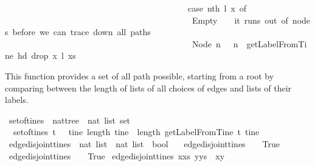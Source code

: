 \begin{isabellebody}
\ \ \ \ \ \ \ \ \ \ \ \ \ \ \ \ \ \ \ \ \ \ \ \ \ \ \ \ \ \ \ \ \ \ \ \ \ \ \ \ \ \ \ {\isacharparenleft}case\ nth\ l\ x\ of\ \isanewline
\ \ \ \ \ \ \ \ \ \ \ \ \ \ \ \ \ \ \ \ \ \ \ \ \ \ \ \ \ \ \ \ \ \ \ \ \ \ \ \ \ \ \ \ Empty\ {\isasymRightarrow}\ {\isacharbrackleft}{\isacharbrackright}\ {\isacharbar}\ {\isacharparenleft}{\isacharasterisk}it\ runs\ out\ of\ nodes\ before\ we\ can\ trace\ down\ all\ paths{\isacharasterisk}{\isacharparenright}\isanewline
\ \ \ \ \ \ \ \ \ \ \ \ \ \ \ \ \ \ \ \ \ \ \ \ \ \ \ \ \ \ \ \ \ \ \ \ \ \ \ \ \ \ \ \ Node\ n\ {\isacharunderscore}\ {\isasymRightarrow}\ n\ {\isacharhash}\ getLabelFromTine\ {\isacharparenleft}hd\ {\isacharparenleft}drop\ x\ l{\isacharparenright}{\isacharparenright}\ xs{\isacharparenright}{\isacharparenright}{\isachardoublequoteclose}%
\begin{isamarkuptext}%
This function provides a set of all path possible, starting from a root by comparing between
the length of lists of all choices of edges and lists of their labels.%
\end{isamarkuptext}\isamarkuptrue%
\isamarkupfalse%
\ set{\isacharunderscore}of{\isacharunderscore}tines\ {\isacharcolon}{\isacharcolon}\ {\isachardoublequoteopen}nattree\ {\isasymRightarrow}\ {\isacharparenleft}nat\ list{\isacharparenright}\ set{\isachardoublequoteclose}\ \isanewline
\ \ {\isachardoublequoteopen}set{\isacharunderscore}of{\isacharunderscore}tines\ t\ \ {\isacharequal}\ {\isacharbraceleft}tine{\isachardot}\ length\ tine\ {\isacharequal}\ length\ {\isacharparenleft}getLabelFromTine\ t\ tine{\isacharparenright}{\isacharbraceright}{\isachardoublequoteclose}\ \ \isanewline
\isanewline
{}\isamarkupfalse%
\ edge{\isacharunderscore}disjoint{\isacharunderscore}tines\ {\isacharcolon}{\isacharcolon}\ {\isachardoublequoteopen}nat\ list\ {\isasymRightarrow}\ nat\ list\ {\isasymRightarrow}\ bool{\isachardoublequoteclose}\ \isanewline
\ \ {\isachardoublequoteopen}edge{\isacharunderscore}disjoint{\isacharunderscore}tines\ {\isacharbrackleft}{\isacharbrackright}\ {\isacharunderscore}\ {\isacharequal}\ True{\isachardoublequoteclose}\ \isanewline
{\isacharbar}\ {\isachardoublequoteopen}edge{\isacharunderscore}disjoint{\isacharunderscore}tines\ {\isacharunderscore}\ {\isacharbrackleft}{\isacharbrackright}\ {\isacharequal}\ True{\isachardoublequoteclose}\isanewline
{\isacharbar}\ {\isachardoublequoteopen}edge{\isacharunderscore}disjoint{\isacharunderscore}tines\ {\isacharparenleft}x{\isacharhash}xs{\isacharparenright}\ {\isacharparenleft}y{\isacharhash}ys{\isacharparenright}\ {\isacharequal}\ {\isacharparenleft}x{\isasymnoteq}y{\isacharparenright}{\isachardoublequoteclose}%

\end{isabellebody}
